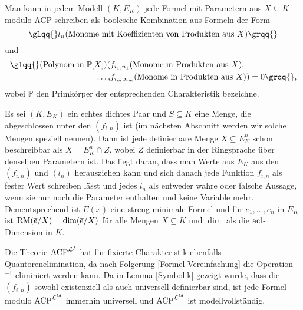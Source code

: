     \begin{corollary}\label{Formel-Vereinfachung}
    	Man kann in jedem Modell $(K,E_K)$ jede Formel mit Parametern aus $X\subseteq K$ modulo ACP schreiben als boolesche Kombination aus Formeln der Form $$\glqq{}l_n(\text{Monome mit Koeffizienten von Produkten aus }X)\grqq{}$$ und
    	\begin{align*}
    	\text{\glqq{}}(\text{Polynom in }\mathbb{P}[X])(&f_{i_1,n_1}(\text{Monome in Produkten aus }X),\\\dots,&f_{i_m,n_m}(\text{Monome in Produkten aus }X))=0\grqq{},
    	\end{align*}
        wobei $\mathbb{P}$ den Primkörper der entsprechenden Charakteristik bezeichne.
    \end{corollary}
    \begin{corollary}
    	Es sei $(K,E_K)$ ein echtes dichtes Paar und $S\subseteq K$ eine Menge, die abgeschlossen unter den $(f_{i,n})$ ist (im nächsten Abschnitt werden wir solche Mengen speziell nennen). Dann ist jede definierbare Menge $X\subseteq E_K^n$ schon beschreibbar als $X=E_K^n\cap Z$, wobei $Z$ definierbar in der Ringsprache über denselben Parametern ist. Das liegt daran, dass man Werte aus $E_K$ aus den $(f_{i,n})$ und $(l_n)$ herausziehen kann und sich danach jede Funktion $f_{i,n}$ als fester Wert schreiben lässt und jedes $l_n$ als entweder wahre oder falsche Aussage, wenn sie nur noch die Parameter enthalten und keine Variable mehr.\\ Dementsprechend ist $E(x)$ eine streng minimale Formel und für $e_1,\dots,e_n$ in $E_K$ ist $\operatorname{RM}(\overline{e}/X)=\dim(\overline{e}/X)$ für alle Mengen $X\subseteq K$ und $\dim$ als die $\operatorname{acl}$-Dimension in $K$.
    \end{corollary}
    \begin{corollary}
    	Die Theorie $\operatorname{ACP}^{\mathcal{L}^f}$ hat für fixierte Charakteristik ebenfalls Quantorenelimination, da nach Folgerung \ref{Formel-Vereinfachung} die Operation \glqq{}$^{-1}$\grqq{} eliminiert werden kann. Da in Lemma \ref{Symbolik} gezeigt wurde, dass die $(f_{i,n})$ sowohl existenziell als auch universell definierbar sind, ist jede Formel modulo $\operatorname{ACP}^{\mathcal{L}^{ld}}$ immerhin universell und $\operatorname{ACP}^{\mathcal{L}^{ld}}$ ist modellvollständig.
    \end{corollary}
    
